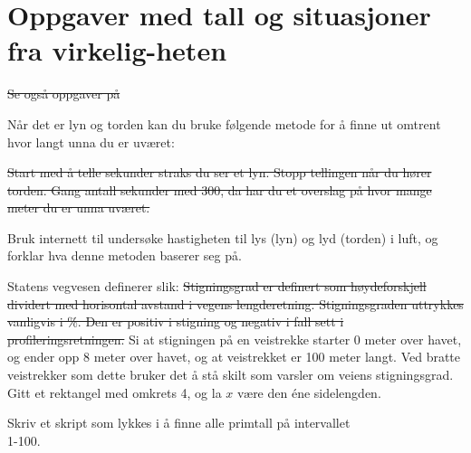 




\section{Oppgaver med tall og situasjoner fra virkelig-heten}	
\st{Se også oppgaver på }	
	
Når det er lyn og torden kan du bruke følgende metode for å finne ut omtrent hvor langt unna du er uværet:\os

\st{Start med å telle sekunder straks du ser et lyn. Stopp tellingen når du hører torden. Gang antall sekunder med 300, da har du et overslag på hvor mange meter du er unna uværet.}

Bruk internett til undersøke hastigheten til lys (lyn) og lyd (torden) i luft, og forklar hva denne metoden baserer seg på.

Statens vegvesen definerer  slik:
\st{
Stigningsgrad er definert som høydeforskjell dividert med horisontal avstand i vegens lengderetning.
Stigningsgraden uttrykkes vanligvis i \%. Den er positiv i stigning og negativ i fall sett i
profileringsretningen.
}
Si at stigningen på en veistrekke starter 0 meter over havet, og ender opp 8 meter over havet, og at veistrekket er 100 meter langt. Ved bratte veistrekker som dette bruker det å stå skilt som varsler om veiens stigningsgrad.
 \newpage
{} 
Gitt et rektangel med omkrets 4, og la $ x $ være den éne sidelengden.

Skriv et skript som lykkes i å finne alle primtall på intervallet\\ 1-100.

